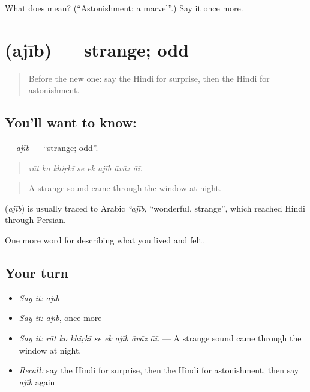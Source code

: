\begin{tcolorbox}[breakable,colback=teal!4,colframe=teal!35!black,title={Before you move on}]
What does  mean? (\textquotedblleft{}Astonishment; a marvel\textquotedblright{}.) Say it once more.
\end{tcolorbox}
\section[\texorpdfstring{\hi{अजीब} (ajīb)}{अजीब (ajīb)}]{ (ajīb) — strange; odd}

\label{lesson:HI-C454-ajib}



\begin{quote}
Before the new one: say the Hindi for surprise, then the Hindi for astonishment.
\end{quote}

\subsection*{You'll want to know: }
\textbf{} — \emph{ajīb} — \textquotedblleft{}strange; odd\textquotedblright{}.

\begin{quote}
       
\end{quote}

\begin{quote}
\emph{rāt ko khiṛkī se ek ajīb āvāz āī.}
\end{quote}

\begin{quote}
A strange sound came through the window at night.
\end{quote}

\begin{cousinweb}
\textbf{} (\emph{ajīb}) is usually traced to Arabic \emph{ʿajīb}, \textquotedblleft{}wonderful, strange\textquotedblright{}, which reached Hindi through Persian.
\end{cousinweb}

\begin{grammarlens}[title={What you've built}]
One more word for describing what you lived and felt.
\end{grammarlens}

\subsection*{Your turn}
\begin{itemize}
\raggedright
  \item \emph{Say it:} \emph{ajīb}
  \item \emph{Say it:} \emph{ajīb}, once more
  \item \emph{Say it:} \emph{rāt ko khiṛkī se ek ajīb āvāz āī.} — A strange sound came through the window at night.
  \item \emph{Recall:} say the Hindi for surprise, then the Hindi for astonishment, then say \emph{ajīb} again
\end{itemize}

